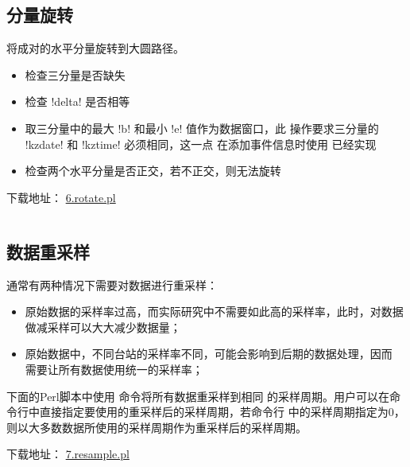 \subsection{分量旋转}
\label{subsec:rotate-perl}
将成对的水平分量旋转到大圆路径。
\begin{itemize}
\item 检查三分量是否缺失
\item 检查 !delta! 是否相等
\item 取三分量中的最大 !b! 和最小 !e! 值作为数据窗口，此
    操作要求三分量的 !kzdate! 和 !kztime! 必须相同，这一点
    在添加事件信息时使用  已经实现
\item 检查两个水平分量是否正交，若不正交，则无法旋转
\end{itemize}

下载地址： \href{https://raw.githubusercontent.com/seisman/SAC_Docs_zh/master/call-in-script/6.rotate.pl}{6.rotate.pl}
\inputminted{perl}{./call-in-script/6.rotate.pl}

\subsection{数据重采样}
\label{subsec:resample-perl}
通常有两种情况下需要对数据进行重采样：
\begin{itemize}
\item 原始数据的采样率过高，而实际研究中不需要如此高的采样率，此时，对数据
    做减采样可以大大减少数据量；
\item 原始数据中，不同台站的采样率不同，可能会影响到后期的数据处理，因而
    需要让所有数据使用统一的采样率；
\end{itemize}
下面的Perl脚本中使用  命令将所有数据重采样到相同
的采样周期。用户可以在命令行中直接指定要使用的重采样后的采样周期，若命令行
中的采样周期指定为0，则以大多数数据所使用的采样周期作为重采样后的采样周期。

下载地址： \href{https://raw.githubusercontent.com/seisman/SAC_Docs_zh/master/call-in-script/7.resample.pl}{7.resample.pl}
\inputminted{perl}{./call-in-script/7.resample.pl}
